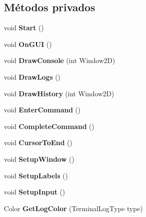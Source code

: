 \subsection*{Métodos privados}
\begin{DoxyCompactItemize}
\item 
\mbox{\label{class_command_terminal_1_1_terminal_a93785fa353916ef82d5233728c769e44}} 
void {\bfseries Start} ()
\item 
\mbox{\label{class_command_terminal_1_1_terminal_a71ba4a542d5050b34b0c922e0705318a}} 
void {\bfseries On\+G\+UI} ()
\item 
\mbox{\label{class_command_terminal_1_1_terminal_a5535073409620f522d137c873ac2d606}} 
void {\bfseries Draw\+Console} (int Window2D)
\item 
\mbox{\label{class_command_terminal_1_1_terminal_af2e577f6a02709082bcbffbb0ece2fda}} 
void {\bfseries Draw\+Logs} ()
\item 
\mbox{\label{class_command_terminal_1_1_terminal_a30d522b80d08c5b7f7bf713b6ed3a9d2}} 
void {\bfseries Draw\+History} (int Window2D)
\item 
\mbox{\label{class_command_terminal_1_1_terminal_ae238f2c87ee1967903ffe4891eb07c21}} 
void {\bfseries Enter\+Command} ()
\item 
\mbox{\label{class_command_terminal_1_1_terminal_afed1278b78ae3fac56dc17d138f6be63}} 
void {\bfseries Complete\+Command} ()
\item 
\mbox{\label{class_command_terminal_1_1_terminal_a570ba2eaebe10e7b5667a3f0fd91ab5c}} 
void {\bfseries Cursor\+To\+End} ()
\item 
\mbox{\label{class_command_terminal_1_1_terminal_a8ef7d04200858fe050a95a65200eedda}} 
void {\bfseries Setup\+Window} ()
\item 
\mbox{\label{class_command_terminal_1_1_terminal_a891534db49c0bb957ca7b50834169e1a}} 
void {\bfseries Setup\+Labels} ()
\item 
\mbox{\label{class_command_terminal_1_1_terminal_a633de8a262954665538e5e16b5abe090}} 
void {\bfseries Setup\+Input} ()
\item 
\mbox{\label{class_command_terminal_1_1_terminal_aac53b384414abc816aa36523aae089b2}} 
Color {\bfseries Get\+Log\+Color} (Terminal\+Log\+Type type)
\end{DoxyCompactItemize}
